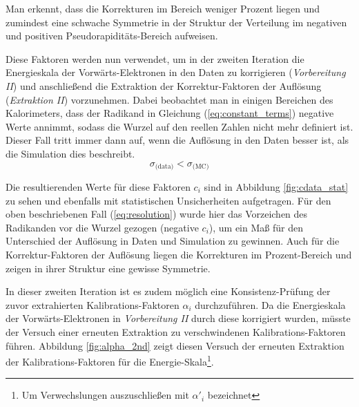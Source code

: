 Man erkennt, dass die Korrekturen im Bereich weniger Prozent liegen und
zumindest eine schwache Symmetrie in der Struktur der Verteilung im negativen
und positiven Pseudorapiditäts-Bereich aufweisen.

Diese Faktoren werden nun verwendet, um in der zweiten Iteration die
Energieskala der Vorwärts-Elektronen in den Daten zu korrigieren
(\textit{Vorbereitung II}) und anschließend die Extraktion der
Korrektur-Faktoren der Auflösung (\textit{Extraktion II}) vorzunehmen.
Dabei beobachtet man in einigen Bereichen des Kalorimeters, dass der Radikand
in Gleichung (\ref{eq:constant_terms}) negative Werte annimmt, sodass die
Wurzel auf den reellen Zahlen nicht mehr definiert ist. Dieser Fall tritt immer
dann auf, wenn die Auflösung in den Daten besser ist, als die Simulation dies
beschreibt.
\begin{equation}
    \sigma_\text{(data)} < \sigma_\text{(MC)}
    \label{eq:resolution}
\end{equation}

Die resultierenden Werte für diese Faktoren $c_i$ sind in Abbildung
\ref{fig:cdata_stat} zu sehen und ebenfalls mit statistischen Unsicherheiten
aufgetragen. Für den oben beschriebenen Fall (\ref{eq:resolution}) wurde hier
das Vorzeichen des Radikanden vor die Wurzel gezogen (negative $c_i$), um ein
Maß für den Unterschied der Auflösung in Daten und Simulation zu gewinnen. Auch
für die Korrektur-Faktoren der Auflösung liegen die Korrekturen im
Prozent-Bereich und zeigen in ihrer Struktur eine gewisse Symmetrie.

In dieser zweiten Iteration ist es zudem möglich eine Konsistenz-Prüfung der
zuvor extrahierten Kalibrations-Faktoren $\alpha_i$ durchzuführen. Da die
Energieskala der Vorwärts-Elektronen in \textit{Vorbereitung II} durch diese
korrigiert wurden, müsste der Versuch einer erneuten Extraktion zu
verschwindenen Kalibrations-Faktoren führen. Abbildung \ref{fig:alpha_2nd}
zeigt diesen Versuch der erneuten Extraktion der Kalibrations-Faktoren für die
Energie-Skala\footnote{Um Verwechslungen auszuschließen mit $\alpha'_i$
bezeichnet}.

